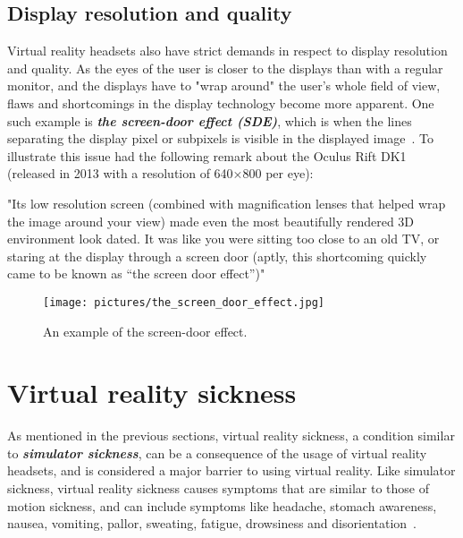 \subsection{Display resolution and quality}
Virtual reality headsets also have strict demands in respect to display resolution and quality. As the eyes of the user is closer
to the displays than with a regular monitor, and the displays have to "wrap around" the user's whole field of view, flaws and shortcomings in the display technology 
become more apparent. 
One such example is \textbf{\textit{the screen-door effect (SDE)}}, 
which is when the lines separating the display pixel or subpixels is visible in the displayed image~\citep{TC2016}. 
To illustrate this issue \citet{TC2016} had the following remark about the Oculus Rift DK1 (released in 2013 with a resolution of 640×800 per eye):

"Its low resolution screen (combined with magnification lenses that helped wrap the image around your view) made even the most beautifully rendered 3D environment look dated. 
It was like you were sitting too close to an old TV, or staring at the display through a screen door (aptly, this shortcoming quickly came to be known as “the screen door effect”)"

\begin{figure}%
	\texttt{[image: pictures/the\_screen\_door\_effect.jpg]}
	\caption[The screen-door effect]{An example of the screen-door effect.}
	\label{fig:the_screen_door_effect}
\end{figure} 

\section{Virtual reality sickness}

As mentioned in the previous sections, virtual reality sickness, a condition similar to \textbf{\textit{simulator sickness}}, 
can be a consequence of the usage of virtual reality headsets, and is considered a major barrier to 
using virtual reality. Like simulator sickness, virtual reality sickness causes symptoms that are similar to those of motion sickness, and can include symptoms like 
headache, stomach awareness, nausea, vomiting, pallor, sweating, fatigue, drowsiness and disorientation~\citep{Kolasinski1995}. 


